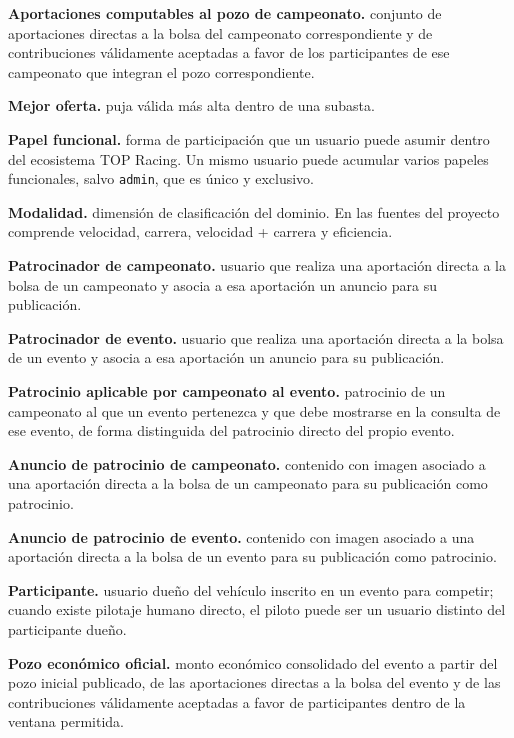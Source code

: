 \documentclass[10pt,letterpaper]{article}
\begin{document}
\noindent\textbf{Aportaciones computables al pozo de campeonato.} conjunto de aportaciones directas a la bolsa del campeonato correspondiente y de contribuciones válidamente aceptadas a favor de los participantes de ese campeonato que integran el pozo correspondiente.\par
\noindent\textbf{Mejor oferta.} puja válida más alta dentro de una subasta.\par
\noindent\textbf{Papel funcional.} forma de participación que un usuario puede asumir dentro del ecosistema TOP Racing. Un mismo usuario puede acumular varios papeles funcionales, salvo \texttt{admin}, que es único y exclusivo.\par
\noindent\textbf{Modalidad.} dimensión de clasificación del dominio. En las fuentes del proyecto comprende velocidad, carrera, velocidad + carrera y eficiencia.\par
\noindent\textbf{Patrocinador de campeonato.} usuario que realiza una aportación directa a la bolsa de un campeonato y asocia a esa aportación un anuncio para su publicación.\par
\noindent\textbf{Patrocinador de evento.} usuario que realiza una aportación directa a la bolsa de un evento y asocia a esa aportación un anuncio para su publicación.\par
\noindent\textbf{Patrocinio aplicable por campeonato al evento.} patrocinio de un campeonato al que un evento pertenezca y que debe mostrarse en la consulta de ese evento, de forma distinguida del patrocinio directo del propio evento.\par
\noindent\textbf{Anuncio de patrocinio de campeonato.} contenido con imagen asociado a una aportación directa a la bolsa de un campeonato para su publicación como patrocinio.\par
\noindent\textbf{Anuncio de patrocinio de evento.} contenido con imagen asociado a una aportación directa a la bolsa de un evento para su publicación como patrocinio.\par
\noindent\textbf{Participante.} usuario dueño del vehículo inscrito en un evento para competir; cuando existe pilotaje humano directo, el piloto puede ser un usuario distinto del participante dueño.\par
\noindent\textbf{Pozo económico oficial.} monto económico consolidado del evento a partir del pozo inicial publicado, de las aportaciones directas a la bolsa del evento y de las contribuciones válidamente aceptadas a favor de participantes dentro de la ventana permitida.\par
\end{document}
